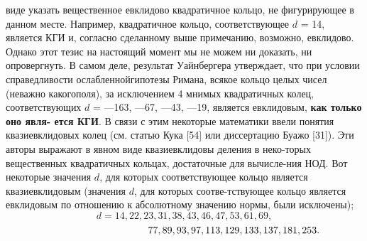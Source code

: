\documentclass{mai_book}
\begin{document}
виде указать вещественное евклидово квадратичное кольцо, не \linebreak фигурирующее в данном месте. Например, квадратичное кольцо, \linebreak соответствующее $d$ = 14, является КГИ и, согласно сделанному выше примечанию, возможно, евклидово. Однако этот тезис на настоящий момент
мы не можем ни доказать, ни опровергнуть. В самом деле, результат\linebreak
Уайнбергера утверждает, что при условии справедливости ослабленной\linebreak гипотезы Римана, всякое кольцо целых чисел (неважно какого\linebreak поля), за исключением 4 мнимых квадратичных колец, соответствующих\linebreak
$d$ = —163, —67, —43, —19, является евклидовым, \textbf{как только оно явля-\linebreak
ется КГИ}.\newline
\hspace*{10pt} В связи с этим некоторые математики ввели понятия квазиевклидовых колец (см. статью Кука [54] или диссертацию Буажо [31]). Эти\linebreak
авторы выражают в явном виде квазиевклидовы деления в неко-\linebreak торых вещественных квадратичных кольцах, достаточные для вычисле-\linebreak ния НОД. Вот некоторые значения $d$, для которых соответствующее
кольцо является квазиевклидовым (значения $d$, для которых соотве-\linebreak тствующее кольцо является евклидовым по отношению к абсолютному\linebreak
значению нормы, были исключены);
$$d = 14,22,23,31,38,43,46,47,53,61,69,$$
$$\hspace*{100pt}77,89,93,97,113,129,133,137,181,253.$$\linebreak\pagebreak

\end{document}
